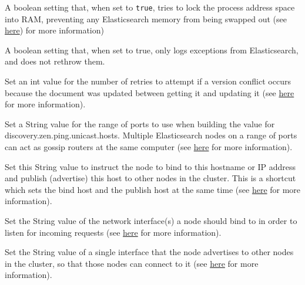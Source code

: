 \begin{description}
\tightlist
\item[\texttt{bootstrapMlockAll=false}]
A boolean setting that, when set to \texttt{true}, tries to lock the
process address space into RAM, preventing any Elasticsearch memory from
being swapped out (see
\href{https://www.elastic.co/guide/en/elasticsearch/reference/6.5/setup-configuration-memory.html\#bootstrap-memory_lock}{here})
for more information)
\item[\texttt{logExceptionsOnly=true}]
A boolean setting that, when set to true, only logs exceptions from
Elasticsearch, and does not rethrow them.
\item[\texttt{retryOnConflict=5}]
Set an int value for the number of retries to attempt if a version
conflict occurs because the document was updated between getting it and
updating it (see
\href{https://www.elastic.co/guide/en/elasticsearch/reference/6.5/docs-update.html\#_parameters_3}{here}
for more information).
\item[\texttt{discoveryZenPingUnicastHostsPort=9300-9400}]
Set a String value for the range of ports to use when building the value
for discovery.zen.ping.unicast.hosts. Multiple Elasticsearch nodes on a
range of ports can act as gossip routers at the same computer (see
\href{https://www.elastic.co/guide/en/elasticsearch/reference/6.5/modules-discovery-zen.html}{here}
for more information).
\item[\texttt{networkHost=}]
Set this String value to instruct the node to bind to this hostname or
IP address and publish (advertise) this host to other nodes in the
cluster. This is a shortcut which sets the bind host and the publish
host at the same time (see
\href{https://www.elastic.co/guide/en/elasticsearch/reference/6.5/modules-network.html\#common-network-settings}{here}
for more information).
\item[\texttt{networkBindHost=}]
Set the String value of the network interface(s) a node should bind to
in order to listen for incoming requests (see
\href{https://www.elastic.co/guide/en/elasticsearch/reference/6.5/modules-network.html\#advanced-network-settings}{here}
for more information).
\item[\texttt{networkPublishHost=}]
Set the String value of a single interface that the node advertises to
other nodes in the cluster, so that those nodes can connect to it (see
\href{https://www.elastic.co/guide/en/elasticsearch/reference/6.5/modules-network.html\#advanced-network-settings}{here}
for more information).
\item[\texttt{transportTcpPort=}]

\end{description}
